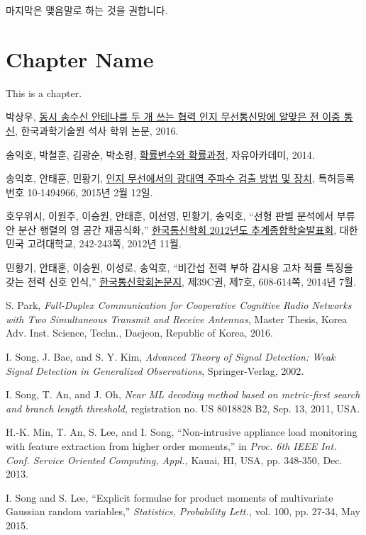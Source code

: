 \documentclass[master,english,final]{kaist-ucs} %
\begin{document}
마지막은 맺음말로 하는 것을 권합니다.

\setcounter{chapter}{0}
\appendix
\makeatletter %
\renewcommand{\@chapapp}{Appendix} %
\renewcommand{\chaptername}{Appendix} %
\makeatother %

\chapter{Chapter Name}
This is a chapter.

\begin{thebibliography}{00}

 박상우, \underline{동시 송수신 안테나를 두 개 쓰는 협력 인지 무선통신망에 알맞은 전 이중 통신}, 한국과학기술원 석사 학위 논문, 2016.

 송익호, 박철훈, 김광순, 박소령, \underline{확률변수와 확률과정}, 자유아카데미, 2014.

 송익호, 안태훈, 민황기, \underline{인지 무선에서의 광대역 주파수 검출 방법 및 장치}, 특허등록번호 10-1494966, 2015년 2월 12일.

 호우위시, 이원주, 이승원, 안태훈, 이선영, 민황기, 송익호, “선형 판별 분석에서 부류안 분산 행렬의 영 공간 재공식화,” \underline{한국통신학회 2012년도 추계종합학술발표회}, 대한민국 고려대학교, 242-243쪽, 2012년 11월.

 민황기, 안태훈, 이승원, 이성로, 송익호, “비간섭 전력 부하 감시용 고차 적률 특징을 갖는 전력 신호 인식,” \underline{한국통신학회논문지}, 제39C권, 제7호, 608-614쪽, 2014년 7월.



 S. Park, \textit{Full-Duplex Communication for Cooperative Cognitive Radio Networks with Two Simultaneous Transmit and Receive Antennas}, Master Thesis, Korea Adv. Inst. Science, Techn., Daejeon, Republic of Korea, 2016.

  I. Song, J. Bae, and S. Y. Kim, \textit{Advanced Theory of Signal Detection: Weak Signal Detection in Generalized Observations}, Springer-Verlag, 2002.

 I. Song, T. An, and J. Oh, \textit{Near ML decoding method based on metric-first search and branch length threshold,} registration no. US 8018828 B2, Sep. 13, 2011, USA. 

 H.-K. Min, T. An, S. Lee, and I. Song, “Non-intrusive appliance load monitoring with feature extraction from higher order moments,” in \textit{Proc. 6th IEEE Int. Conf. Service Oriented Computing, Appl.,} Kauai, HI, USA, pp. 348-350, Dec. 2013.

 I. Song and S. Lee, “Explicit formulae for product moments of multivariate Gaussian random variables,” \textit{Statistics, Probability Lett.,} vol. 100, pp. 27-34, May 2015.

\end{thebibliography}
\end{document}
